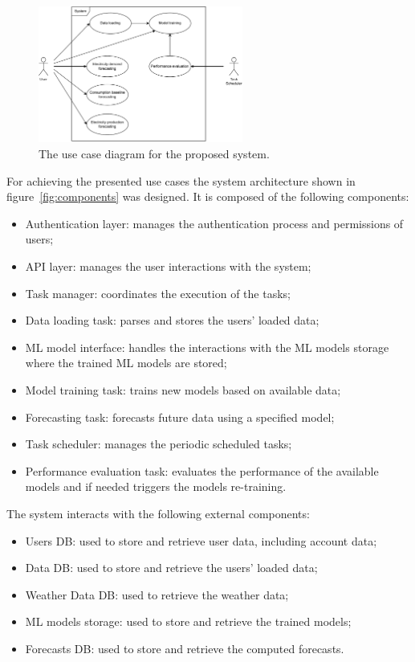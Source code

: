 \begin{figure}[H]
\centering
\includegraphics[width=0.6\textwidth]{images/architecture_use_case}
\caption{The use case diagram for the proposed system.}
\label{fig:usecase}
\end{figure}

For achieving the presented use cases the system architecture shown in figure~\ref{fig:components} was designed.
It is composed of the following components:
\begin{itemize}
  \item Authentication layer: manages the authentication process and permissions of users;
  \item API layer: manages the user interactions with the system;
  \item Task manager: coordinates the execution of the tasks;
  \item Data loading task: parses and stores the users' loaded data;
  \item ML model interface: handles the interactions with the ML models storage where the trained ML models are stored;
  \item Model training task: trains new models based on available data;
  \item Forecasting task: forecasts future data using a specified model;
  \item Task scheduler: manages the periodic scheduled tasks;
  \item Performance evaluation task: evaluates the performance of the available models and if needed triggers the models re-training.
\end{itemize}

The system interacts with the following external components:
\begin{itemize}
  \item Users DB: used to store and retrieve user data, including account data;
  \item Data DB: used to store and retrieve the users' loaded data;
  \item Weather Data DB: used to retrieve the weather data;
  \item ML models storage: used to store and retrieve the trained models;
  \item Forecasts DB: used to store and retrieve the computed forecasts.
\end{itemize}

